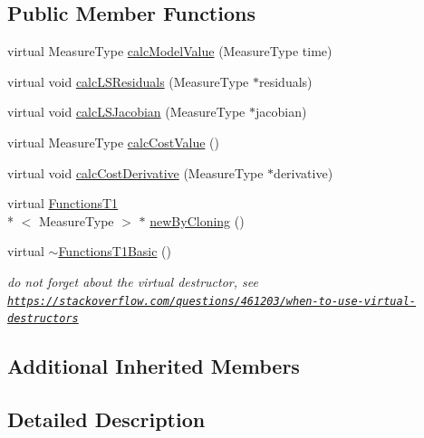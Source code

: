 \subsection*{Public Member Functions}
\begin{DoxyCompactItemize}
\item 
virtual Measure\-Type \hyperlink{class_ox_1_1_functions_t1_basic_ad23b00edd74fdf78c7d21fa82bb66e6e}{calc\-Model\-Value} (Measure\-Type time)
\item 
virtual void \hyperlink{class_ox_1_1_functions_t1_basic_ac9f77d95d7b39f2333b520d3a2e639e9}{calc\-L\-S\-Residuals} (Measure\-Type $\ast$residuals)
\item 
virtual void \hyperlink{class_ox_1_1_functions_t1_basic_a3beaaac6e2e1be4f9bd2e7cba7c51057}{calc\-L\-S\-Jacobian} (Measure\-Type $\ast$jacobian)
\item 
virtual Measure\-Type \hyperlink{class_ox_1_1_functions_t1_basic_adee7b03ad49d28e5dc08a80b2c948da1}{calc\-Cost\-Value} ()
\item 
virtual void \hyperlink{class_ox_1_1_functions_t1_basic_aa6a067295d09882f70eeb34b260c37b7}{calc\-Cost\-Derivative} (Measure\-Type $\ast$derivative)
\item 
virtual \hyperlink{class_ox_1_1_functions_t1}{Functions\-T1}\\*
$<$ Measure\-Type $>$ $\ast$ \hyperlink{class_ox_1_1_functions_t1_basic_a0bceaf2c2b424cfa2366d943d92814e3}{new\-By\-Cloning} ()
\item 
\hypertarget{class_ox_1_1_functions_t1_basic_ae3f94c1426a8e6f569b8c70f86122c0b}{virtual \hyperlink{class_ox_1_1_functions_t1_basic_ae3f94c1426a8e6f569b8c70f86122c0b}{$\sim$\-Functions\-T1\-Basic} ()}\label{class_ox_1_1_functions_t1_basic_ae3f94c1426a8e6f569b8c70f86122c0b}

\begin{DoxyCompactList}\small\item\em do not forget about the virtual destructor, see \href{https://stackoverflow.com/questions/461203/when-to-use-virtual-destructors}{\tt https\-://stackoverflow.\-com/questions/461203/when-\/to-\/use-\/virtual-\/destructors} \end{DoxyCompactList}\end{DoxyCompactItemize}
\subsection*{Additional Inherited Members}


\subsection{Detailed Description}
